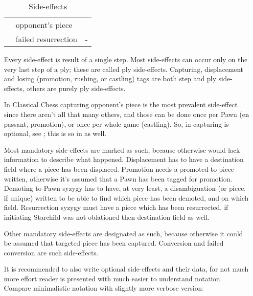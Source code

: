 \begin{table}[!h]
\begin{tabular}{ rlc }
                            & opponent's piece              &                       \\
\cmidrule{1-3} %
\alg{\$\$\$}                & failed resurrection           & -                     \\
\bottomrule %
\end{tabular}
\vspace*{-0.3\baselineskip}
\caption{Side-effects}
\label{tbl:Appendix/Summary/Side-effects}
\end{table}


\clearpage %

Every side-effect is result of a single step. Most side-effects can occur only on
the very last step of a ply; these are called ply side-effects. Capturing, displacement
and losing (promotion, rushing, or castling) tags are both step and ply side-effects,
others are purely ply side-effects.

In Classical Chess capturing opponent's piece is the most prevalent side-effect
since there aren't all that many others, and those can be done once per Pawn (en
passant, promotion), or once per whole game (castling). So, in 
capturing is optional, see ; this is so in  as well.

Most mandatory side-effects are marked as such, because otherwise 
would lack information to describe what happened. Displacement has to have a
destination field where a piece has been displaced. Promotion needs a promoted-to
piece written, otherwise it's assumed that a Pawn has been tagged for promotion.
Demoting to Pawn syzygy has to have, at very least, a disambiguation (or piece,
if unique) written to be able to find which piece has been demoted, and on which
field. Resurrection syzygy must have a piece which has been resurrected, if
initiating Starchild was not oblationed then destination field as well.

Other mandatory side-effects are designated as such, because otherwise it could
be assumed that targeted piece has been captured. Conversion and failed conversion
are such side-effects.

It is recommended to also write optional side-effects and their data, for not much
more effort reader is presented with much easier to understand notation. Compare
minimalistic notation with slightly more verbose version:

